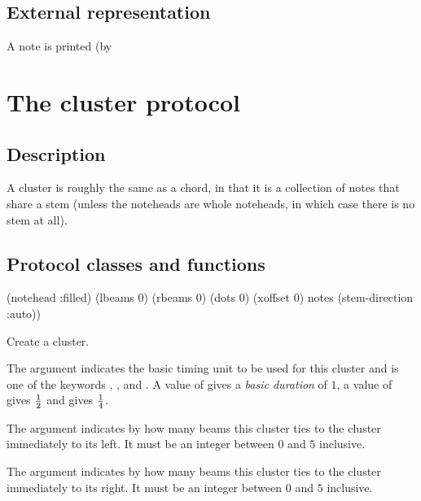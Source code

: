 \subsection{External representation}

A note is printed (by 

\section{The cluster protocol}

\subsection{Description}

A cluster is roughly the same as a chord, in that it is a collection
of notes that share a stem (unless the noteheads are whole noteheads,
in which case there is no stem at all).

\subsection{Protocol classes and functions}


 {\key (notehead :filled) (lbeams 0) (rbeams 0)
		       (dots 0) (xoffset 0) notes (stem-direction :auto))}

Create a cluster.

The  argument indicates the basic timing unit to be
used for this cluster and is one of the keywords ,
, and .  A value of 
gives a \emph{basic duration} of $1$, a value of  gives $1
\over 2$ and  gives $1 \over 4$. 

The  argument indicates by how many beams this cluster
ties to the cluster immediately to its left.  It must be an integer
between $0$ and $5$ inclusive. 

The  argument indicates by how many beams this cluster
ties to the cluster immediately to its right.  It must be an integer
between $0$ and $5$ inclusive. 

